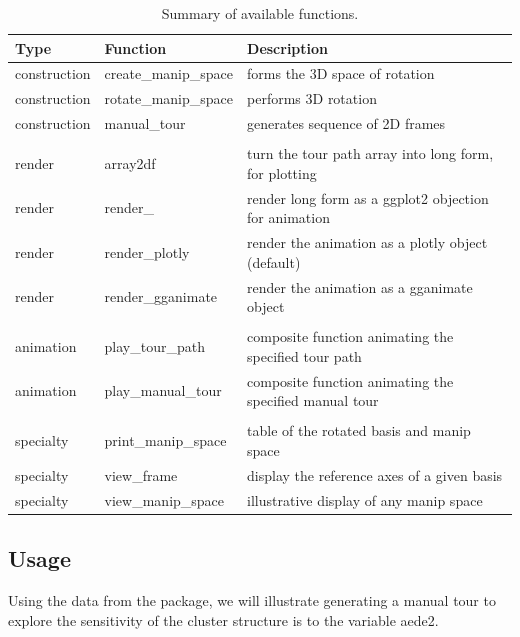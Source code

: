 \begin{Schunk}
\begin{table}

\caption{\label{tab:functionsTable}Summary of available functions.}
\centering
\begin{tabular}[t]{lll}
\toprule
Type & Function & Description\\
\midrule
construction & create\_manip\_space & forms the 3D space of rotation\\
construction & rotate\_manip\_space & performs 3D rotation\\
construction & manual\_tour & generates sequence of 2D frames\\
 &  & \\
render & array2df & turn the tour path array into long form, for plotting\\
render & render\_ & render long form as a ggplot2 objection for animation\\
render & render\_plotly & render the animation as a plotly object (default)\\
render & render\_gganimate & render the animation as a gganimate object\\
 &  & \\
animation & play\_tour\_path & composite function animating the specified tour path\\
animation & play\_manual\_tour & composite function animating the specified manual tour\\
 &  & \\
specialty & print\_manip\_space & table of the rotated basis and manip space\\
specialty & view\_frame & display the reference axes of a given basis\\
specialty & view\_manip\_space & illustrative display of any manip space\\
\bottomrule
\end{tabular}
\end{table}

\end{Schunk}

\hypertarget{sec:usage}{%
\subsection{Usage}\label{sec:usage}}

Using the  data from the  package, we will
illustrate generating a manual tour to explore the sensitivity of the
cluster structure is to the variable aede2.

